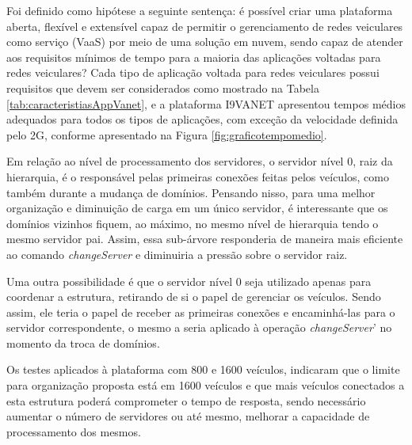 \documentclass[
	12pt,				%
	oneside,			%
	a4paper,			%
	english,			%
	brazil				%
	]{abntex2ppgsi}
\begin{document}
Foi definido como hipótese a seguinte sentença: é possível criar uma plataforma aberta, flexível e extensível capaz de permitir o gerenciamento de redes veiculares como serviço (VaaS) por meio de uma solução em nuvem, sendo capaz de atender aos requisitos mínimos de tempo para a maioria das aplicações voltadas para redes veiculares? Cada tipo de aplicação voltada para redes veiculares possui requisitos que devem ser considerados como mostrado na Tabela \ref{tab:caracteristiasAppVanet}, e a plataforma I9VANET apresentou tempos médios adequados para todos os tipos de aplicações, com exceção da velocidade definida pelo 2G, conforme apresentado na Figura \ref{fig:graficotempomedio}.



Em relação ao nível de processamento dos servidores, o servidor nível 0, raiz da hierarquia, é o responsável pelas primeiras conexões feitas pelos veículos, como também durante a mudança de domínios. Pensando nisso, para uma melhor organização e diminuição de carga em um único servidor, é interessante que os domínios vizinhos fiquem, ao máximo, no mesmo nível de hierarquia tendo o mesmo servidor pai. Assim, essa sub-árvore responderia de maneira mais eficiente ao comando \textit{changeServer} e diminuiria a pressão sobre o servidor raiz.

Uma outra possibilidade é que o servidor nível 0 seja utilizado apenas para coordenar a estrutura, retirando de si o papel de gerenciar os veículos. Sendo assim, ele teria o papel de receber as primeiras conexões  e encaminhá-las para o servidor correspondente, o mesmo a seria aplicado à operação \textit{changeServer}' no momento da troca de domínios.

Os testes aplicados à plataforma com 800 e 1600 veículos, indicaram que o limite para organização proposta está em 1600 veículos e que mais veículos conectados a esta estrutura poderá comprometer o tempo de resposta, sendo necessário aumentar o número de servidores ou até mesmo, melhorar a capacidade de processamento dos mesmos. 

\end{document}
